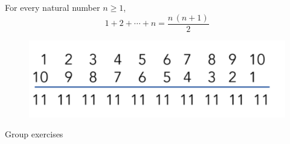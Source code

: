 \documentclass[10pt]{beamer}
\begin{document}
\begin{frame}

\begin{mygreenbox}[title=\text{Theorem: Sum of the first $n$ natural numbers}]

For every natural number $n \geq 1$, 
\[ 1 + 2 + \cdots + n = \frac{n \, (n+1)}{2} \]
\end{mygreenbox}

\vfill 

\begin{myredbox}[title=\text{How to visualize the above}]
\begin{figure}
\includegraphics[width=\textwidth]{images/gauss_sum.png}	
\end{figure}	
\end{myredbox}

\end{frame}




\begin{frame}[standout]
Group exercises
\end{frame}
\end{document}
